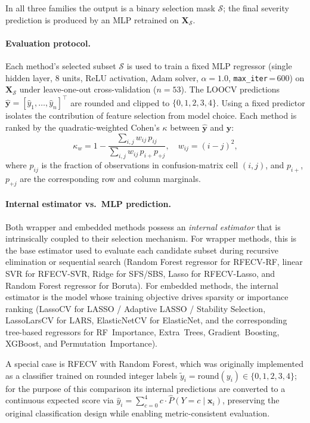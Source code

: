 \documentclass[conference]{IEEEtran}
\begin{document}
In all three families the output is a binary selection mask $\mathcal{S}$; the final
severity prediction is produced by an MLP retrained on $\mathbf{X}_{\mathcal{S}}$.

\paragraph{Evaluation protocol.}
Each method's selected subset $\mathcal{S}$ is used to train a fixed MLP regressor
(single hidden layer, 8 units, ReLU activation, Adam solver, $\alpha = 1.0$,
\texttt{max\_iter}\,=\,600) on $\mathbf{X}_{\mathcal{S}}$ under leave-one-out
cross-validation ($n = 53$).
The LOOCV predictions $\hat{\mathbf{y}} = [\hat{y}_1, \ldots, \hat{y}_n]^{\top}$ are
rounded and clipped to $\{0,1,2,3,4\}$.
Using a fixed predictor isolates the contribution of feature selection from model choice.
Each method is ranked by the quadratic-weighted Cohen's $\kappa$ between
$\hat{\mathbf{y}}$ and $\mathbf{y}$:
\begin{equation}
    \kappa_w = 1 - \frac{\sum_{i,j} w_{ij}\,p_{ij}}{\sum_{i,j} w_{ij}\,p_{i+}p_{+j}},
    \quad w_{ij} = (i - j)^2,
    \label{eq:kappa}
\end{equation}
where $p_{ij}$ is the fraction of observations in confusion-matrix cell $(i,j)$,
and $p_{i+}$, $p_{+j}$ are the corresponding row and column marginals.

\paragraph{Internal estimator vs.\ MLP prediction.}
Both wrapper and embedded methods possess an \emph{internal estimator} that is
intrinsically coupled to their selection mechanism.
For wrapper methods, this is the base estimator used to evaluate each candidate
subset during recursive elimination or sequential search
(Random Forest regressor for RFECV-RF, linear SVR for RFECV-SVR, Ridge for SFS/SBS,
Lasso for RFECV-Lasso, and Random Forest regressor for Boruta).
For embedded methods, the internal estimator is the model whose training objective
drives sparsity or importance ranking
(LassoCV for LASSO / Adaptive LASSO / Stability Selection,
LassoLarsCV for LARS, ElasticNetCV for ElasticNet,
and the corresponding tree-based regressors for RF~Importance, Extra~Trees,
Gradient~Boosting, XGBoost, and Permutation~Importance).

\noindent A special case is RFECV with Random Forest, which was originally implemented
as a classifier trained on rounded integer labels $\tilde{y}_i = \mathrm{round}(y_i)
\in \{0,1,2,3,4\}$; for the purpose of this comparison its internal predictions are
converted to a continuous expected score via
$\hat{y}_i = \sum_{c=0}^{4} c \cdot \hat{P}(Y{=}c \mid \mathbf{x}_i)$,
preserving the original classification design while enabling metric-consistent evaluation.
\end{document}
